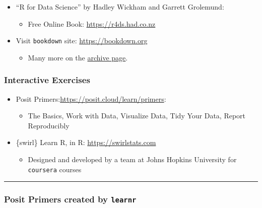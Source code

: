 \documentclass[
]{article}
\providecommand{\tightlist}{%
  \setlength{\itemsep}{0pt}\setlength{\parskip}{0pt}}
\begin{document}
\begin{itemize}
\tightlist
\item
  ``R for Data Science'' by Hadley Wickham and Garrett Grolemund:

  \begin{itemize}
  \tightlist
  \item
    Free Online Book: \url{https://r4ds.had.co.nz}
  \end{itemize}
\item
  Visit \texttt{bookdown} site: \url{https://bookdown.org}

  \begin{itemize}
  \tightlist
  \item
    Many more on the \href{https://bookdown.org/home/archive/}{archive
    page}.
  \end{itemize}
\end{itemize}

\hypertarget{interactive-exercises}{%
\subsubsection{Interactive Exercises}\label{interactive-exercises}}

\begin{itemize}
\tightlist
\item
  Posit Primers:\url{https://posit.cloud/learn/primers}:

  \begin{itemize}
  \tightlist
  \item
    The Basics, Work with Data, Visualize Data, Tidy Your Data, Report
    Reproducibly
  \end{itemize}
\item
  \{swirl\} Learn R, in R: \url{https://swirlstats.com}

  \begin{itemize}
  \tightlist
  \item
    Designed and developed by a team at Johns Hopkins University for
    \texttt{coursera} courses
  \end{itemize}
\end{itemize}

\begin{center}\rule{0.5\linewidth}{0.5pt}\end{center}

\hypertarget{posit-primers-created-by-learnr}{%
\subsubsection{\texorpdfstring{Posit Primers created by
\texttt{learnr}}{Posit Primers created by learnr}}\label{posit-primers-created-by-learnr}}
\end{document}
